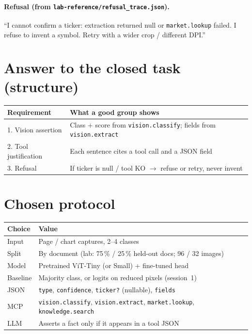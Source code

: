 \documentclass[11pt,a4paper]{article}
\begin{document}
\paragraph{Refusal (from \texttt{lab-reference/refusal\_trace.json}).}
``I cannot confirm a ticker: extraction returned null or \texttt{market.lookup}
failed. I refuse to invent a symbol. Retry with a wider crop / different DPI.''

\section{Answer to the closed task (structure)}

\begin{center}
\renewcommand{\arraystretch}{1.2}
\begin{tabular}{@{}p{4.0cm}p{10.6cm}@{}}
\toprule
\textbf{Requirement} & \textbf{What a good group shows} \\
\midrule
1. Vision assertion & Class + score from \texttt{vision.classify}; fields from \texttt{vision.extract} \\
2. Tool justification & Each sentence cites a tool call and a JSON field \\
3. Refusal & If ticker is null / tool KO $\rightarrow$ refuse or retry, never invent \\
\bottomrule
\end{tabular}
\end{center}

\section{Chosen protocol}

\begin{center}
\renewcommand{\arraystretch}{1.15}
\begin{tabular}{@{}p{3.8cm}p{10.8cm}@{}}
\toprule
\textbf{Choice} & \textbf{Value} \\
\midrule
Input & Page / chart captures, 2--4 classes \\
Split & By document (lab: 75\,\% / 25\,\% held-out docs; 96 / 32 images) \\
Model & Pretrained ViT-Tiny (or Small) + fine-tuned head \\
Baseline & Majority class, or logits on reduced pixels (session~1) \\
JSON & \texttt{type}, \texttt{confidence}, \texttt{ticker?} (nullable), \texttt{fields} \\
MCP & \texttt{vision.classify}, \texttt{vision.extract}, \texttt{market.lookup}, \texttt{knowledge.search} \\
LLM & Asserts a fact only if it appears in a tool JSON \\
\bottomrule
\end{tabular}
\end{center}
\end{document}
